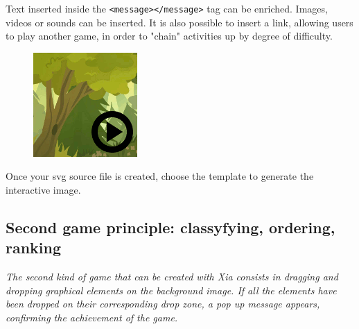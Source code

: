 \begin{tip}
Text inserted inside the \verb|<message></message>| tag can be 
enriched. Images, videos or sounds can be inserted.
It is also possible to insert a link, allowing users to play another game,
in order to "chain" activities up by degree of difficulty.
\end{tip}

\begin{figure}
  \centering
  \includegraphics[scale=0.7]{./images/game1clic} 
\end{figure}

Once your svg source file is created, choose the template  to generate the interactive image.

\subsection{Second game principle: classyfying, ordering, ranking}\label{gameDragAndDropsection}

\textit{The second kind of game that can be created with Xia consists in
dragging and dropping graphical elements on the background image. If all the
elements have been dropped on their corresponding drop zone, a pop up
message appears, confirming the achievement of the game.}


